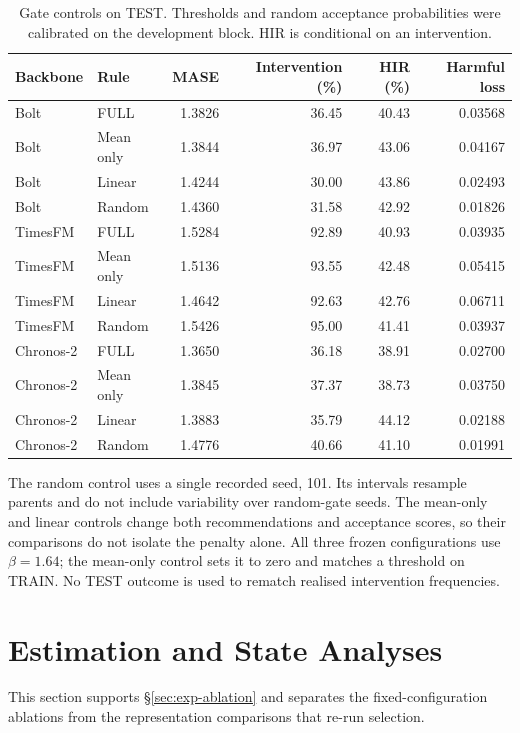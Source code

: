 \documentclass{article}
\begin{document}
\begin{table}[htbp]
\centering\small
\caption{Gate controls on TEST. Thresholds and random acceptance probabilities were
calibrated on the development block. HIR is conditional on an intervention.}
\label{tab:v52-gates}
\begin{tabular}{llrrrr}
\toprule
Backbone & Rule & MASE & Intervention (\%) & HIR (\%) & Harmful loss \\
\midrule
Bolt & FULL & 1.3826 & 36.45 & 40.43 & 0.03568 \\
Bolt & Mean only & 1.3844 & 36.97 & 43.06 & 0.04167 \\
Bolt & Linear & 1.4244 & 30.00 & 43.86 & 0.02493 \\
Bolt & Random & 1.4360 & 31.58 & 42.92 & 0.01826 \\
TimesFM & FULL & 1.5284 & 92.89 & 40.93 & 0.03935 \\
TimesFM & Mean only & 1.5136 & 93.55 & 42.48 & 0.05415 \\
TimesFM & Linear & 1.4642 & 92.63 & 42.76 & 0.06711 \\
TimesFM & Random & 1.5426 & 95.00 & 41.41 & 0.03937 \\
Chronos-2 & FULL & 1.3650 & 36.18 & 38.91 & 0.02700 \\
Chronos-2 & Mean only & 1.3845 & 37.37 & 38.73 & 0.03750 \\
Chronos-2 & Linear & 1.3883 & 35.79 & 44.12 & 0.02188 \\
Chronos-2 & Random & 1.4776 & 40.66 & 41.10 & 0.01991 \\
\bottomrule
\end{tabular}
\end{table}

The random control uses a single recorded seed, 101. Its intervals resample parents and
do not include variability over random-gate seeds. The mean-only and linear controls change
both recommendations and acceptance scores, so their comparisons do not isolate the penalty
alone. All three frozen configurations use $\beta=1.64$; the mean-only control sets it to
zero and matches a threshold on TRAIN. No TEST outcome is used to rematch realised intervention
frequencies.

\section{Estimation and State Analyses}

This section supports \S\ref{sec:exp-ablation} and separates the fixed-configuration
ablations from the representation comparisons that re-run selection.
\end{document}
